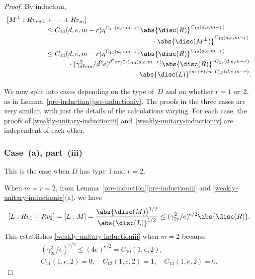 \begin{proof}
By induction,\vspace*{-3pt}
\begin{equation}\label{eqn:Mperp-index}
\begin{aligned}{}
[M^\perp:Rv_{r+1} &+ \dotsb + Rv_m]\\[-3pt]
&\leq C_{10}(d,e,m-r) \eta^{C_{11}(d,e,m-r)} \abs{\disc(R)}^{C_{12}(d,e,m-r)}\\[-3pt]
&\hspace*{5.4cm}\cdot\abs{\disc(M^\perp)}^{C_{13}(d,e,m-r)}
\\
& \leq C_{10}(d,e,m-r) \eta^{C_{11}(d,e,m-r)} \abs{\disc(R)}^{C_{12}(d,e,m-r)}\\[-3pt]
&\hspace*{1.15cm}\cdot(\gamma_{d^2em}^2/d^3e)^{d^2er/2 \cdot C_{13}(d,e,m-r)}\abs{\disc(R)}^{rC_{13}(d,e,m-r)}\\[-3pt]
&\hspace*{4.5cm}\cdot \abs{\disc(L)}^{(m+r)/m \cdot C_{13}(d,e,m-r)}.
\end{aligned}
\end{equation}

We now split into cases depending on the type of~$D$ and on whether $r = 1$ or~$2$, as in Lemma~\ref{pre-induction}\eqref{pre-inductioniv}.
The proofs in the three cases are very similar, with just the details of the calculations varying.
For each case, the proofs of \eqref{weakly-unitary-inductioniii} and~\eqref{weakly-unitary-inductioniv} are independent of each other.

\subsubsection*{Case~(a), part~(iii)}
This is the case when $D$ has type~I and $r=2$.
\par\nopagebreak
When $m=r=2$, from Lemma~\ref{pre-induction}\eqref{pre-inductioniii} and \eqref{weakly-unitary-inductioniv}(a), we have\vspace*{-3pt}
\[
[L:Rv_1 + Rv_2] = [L:M] = \frac{\abs{\disc(M)}^{1/2}}{\abs{\disc(L)}^{1/2}}
\leq (\gamma_{2e}^2/e)^{e/2} \abs{\disc(R)}.
\]
This establishes \eqref{weakly-unitary-inductioniii} when $m=2$ because
\begin{gather*}
(\gamma_{2e}^2/e)^{e/2} \leq (4e)^{e/2} = C_{10}(1,e,2),
\\ C_{11}(1,e,2) = 0,
\quad C_{12}(1,e,2) = 1,
\quad C_{13}(1,e,2) = 0.
\end{gather*}


\end{proof}
